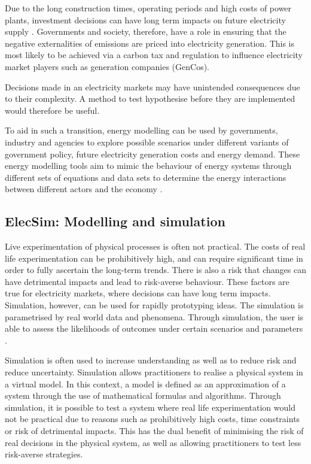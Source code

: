 Due to the long construction times, operating periods and high costs of power plants, investment decisions can have long term impacts on future electricity supply \cite{Chappin2017}. Governments and society, therefore, have a role in ensuring that the negative externalities of emissions are priced into electricity generation. This is most likely to be achieved via a carbon tax and regulation to influence electricity market players such as generation companies (GenCos).


Decisions made in an electricity markets may have unintended consequences due to their complexity. A method to test hypothesise before they are implemented would therefore be useful.

To aid in such a transition, energy modelling can be used by governments, industry and agencies to explore possible scenarios under different variants of government policy, future electricity generation costs and energy demand. These energy modelling tools aim to mimic the behaviour of energy systems through different sets of equations and data sets to determine the energy interactions between different actors and the economy \cite{Machado2019}.





\subsection{ElecSim: Modelling and simulation}




Live experimentation of physical processes is often not practical. The costs of real life experimentation can be prohibitively high, and can require significant time in order to fully ascertain the long-term trends. There is also a risk that changes can have detrimental impacts and lead to risk-averse behaviour. These factors are true for electricity markets, where decisions can have long term impacts. Simulation, however, can be used for rapidly prototyping ideas. The simulation is parametrised by real world data and phenomena. Through simulation, the user is able to assess the likelihoods of outcomes under certain scenarios and parameters \cite{Law:603360}.





Simulation is often used to increase understanding as well as to reduce risk and reduce uncertainty. Simulation allows practitioners to realise a physical system in a virtual model. In this context, a model is defined as an approximation of a system through the use of mathematical formulas and algorithms. Through simulation, it is possible to test a system where real life experimentation would not be practical due to reasons such as prohibitively high costs, time constraints or risk of detrimental impacts. This has the dual benefit of minimising the risk of real decisions in the physical system, as well as allowing practitioners to test less risk-averse strategies.

